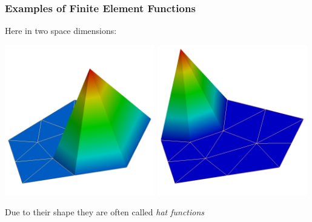 \documentclass[aspectratio=169,11pt]{beamer}
\theoremstyle{definition}
\begin{document}
\begin{frame}
\frametitle{Examples of Finite Element Functions}
Here in two space dimensions:
\begin{center}
\includegraphics[width=0.49\textwidth]{p1_1}
\includegraphics[width=0.49\textwidth]{p1_2}
\end{center}
Due to their shape they are often called {\em hat functions}
\end{frame}
\end{document}
